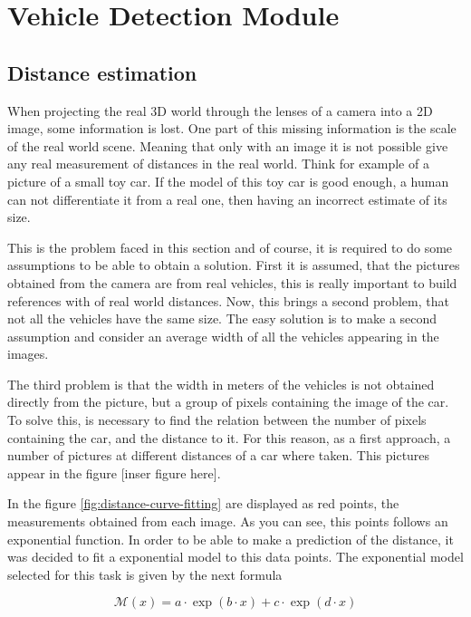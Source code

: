 \chapter{Vehicle Detection Module}  \label{kap:vehicle-detection}

\section{Distance estimation} %
\label{sec:Distance-estimation}

When projecting the real 3D world through the lenses of a camera into a 2D
image, some information is lost. One part of this missing information is the scale of
the real world scene. Meaning that only with an image it is not possible give any real
measurement of distances in the real world. Think for example of a picture of 
a small toy car. If the model of this toy car is good enough, a human can not 
differentiate it from a real one, then having an incorrect estimate of its size.

This is the problem faced in this section and of course, it is required to do some
assumptions to be able to obtain a solution. First it is assumed, that the
pictures obtained from the camera are from real vehicles, this is really
important to build references with of real world distances. Now, this brings a
second problem, that not all the vehicles have the same size. 
The easy solution is to make a second assumption and consider an average width
of all the vehicles appearing in the images.

The third problem is that the width in meters of the vehicles is not obtained 
directly from the picture, but a group of pixels containing the image of
the car. To solve this, is necessary to find the relation between the number of
pixels containing the car, and the distance to it. For this reason, as a first
approach, a number of pictures at different distances of a car where taken. This
pictures appear in the figure [inser figure here].

In the figure \ref{fig:distance-curve-fitting} are displayed as red points, the
measurements obtained from each image. As you can see, this points follows an
exponential function. In order to be able to make a prediction of the distance,
it was decided to fit a exponential model to this data points. The exponential
model selected for this task is given by the next formula

\begin{equation}
    \mathcal{M}(x) = a \cdot \exp(b \cdot x) + c \cdot \exp(d \cdot x)
    \label{eq:distance-curve-model}
\end{equation}

